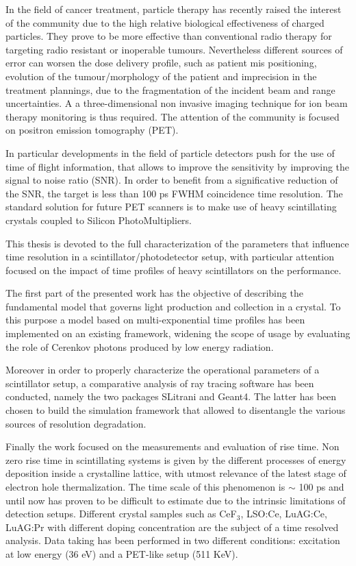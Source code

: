 \abstract

In the field of cancer treatment, particle therapy has recently raised the interest of the community due to the high relative biological effectiveness of charged particles.
They prove to be more effective than conventional radio therapy for targeting radio resistant or inoperable tumours.
Nevertheless different sources of error can worsen the dose delivery profile, such as patient mis positioning, evolution of the tumour/morphology of the patient and imprecision in the treatment plannings, due to the fragmentation of the incident beam and range uncertainties.
A a three-dimensional non invasive imaging technique for ion beam therapy monitoring is thus required. The attention of the community is focused on positron emission tomography (PET).

In particular developments in the field of particle detectors push for the use of time of flight information, that allows to improve the sensitivity by improving the signal to noise ratio (SNR). 
In order to benefit from a significative reduction of the SNR, the target is less than 100 ps FWHM coincidence time resolution.
The standard solution for future PET scanners is to make use of heavy scintillating crystals coupled to Silicon PhotoMultipliers. 

This thesis is devoted to the full characterization of the parameters that influence time resolution in a scintillator/photodetector setup, with particular attention focused on the impact of time profiles of heavy scintillators on the performance.

The first part of the presented work has the objective of describing the fundamental model that governs light production and collection in a crystal.
To this purpose a model based on multi-exponential time profiles has been implemented on an existing framework, widening the scope of usage by evaluating the role of Cerenkov photons produced by low energy radiation.

Moreover in order to properly characterize the operational parameters of a scintillator setup, a comparative analysis of ray tracing software has been conducted, namely the two packages SLitrani and Geant4. The latter has been chosen to build the simulation framework that allowed to disentangle the various sources of resolution degradation.

Finally the work focused on the measurements and evaluation of rise time. Non zero rise time in scintillating systems is given by the different processes of energy deposition inside a crystalline lattice, with utmost relevance of the latest stage of electron hole thermalization. The time scale of this phenomenon is $\sim$ 100 ps and until now has proven to be difficult to estimate due to the intrinsic limitations of detection setups.
Different crystal samples such as CeF$_{3}$, LSO:Ce, LuAG:Ce, LuAG:Pr with different doping concentration are the subject of a time resolved analysis. 
Data taking has been performed in two different conditions: excitation at low energy (36 eV) and a PET-like setup (511 KeV).


